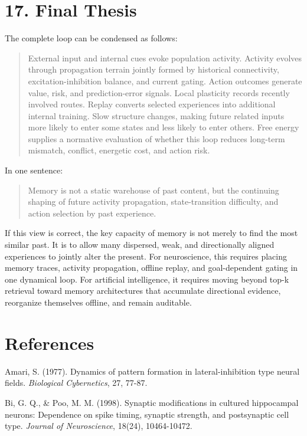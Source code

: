 \documentclass[11pt, a4paper]{article}
\begin{document}
\section{17. Final Thesis}

The complete loop can be condensed as follows:

\begin{quote}
External input and internal cues evoke population activity. Activity evolves through propagation terrain jointly formed by historical connectivity, excitation-inhibition balance, and current gating. Action outcomes generate value, risk, and prediction-error signals. Local plasticity records recently involved routes. Replay converts selected experiences into additional internal training. Slow structure changes, making future related inputs more likely to enter some states and less likely to enter others. Free energy supplies a normative evaluation of whether this loop reduces long-term mismatch, conflict, energetic cost, and action risk.
\end{quote}

In one sentence:

\begin{quote}
Memory is not a static warehouse of past content, but the continuing shaping of future activity propagation, state-transition difficulty, and action selection by past experience.
\end{quote}

If this view is correct, the key capacity of memory is not merely to find the most similar past. It is to allow many dispersed, weak, and directionally aligned experiences to jointly alter the present. For neuroscience, this requires placing memory traces, activity propagation, offline replay, and goal-dependent gating in one dynamical loop. For artificial intelligence, it requires moving beyond top-k retrieval toward memory architectures that accumulate directional evidence, reorganize themselves offline, and remain auditable.


\section*{References}

Amari, S. (1977). Dynamics of pattern formation in lateral-inhibition type neural fields. \textit{Biological Cybernetics}, 27, 77-87.

Bi, G. Q., \& Poo, M. M. (1998). Synaptic modifications in cultured hippocampal neurons: Dependence on spike timing, synaptic strength, and postsynaptic cell type. \textit{Journal of Neuroscience}, 18(24), 10464-10472.
\end{document}
